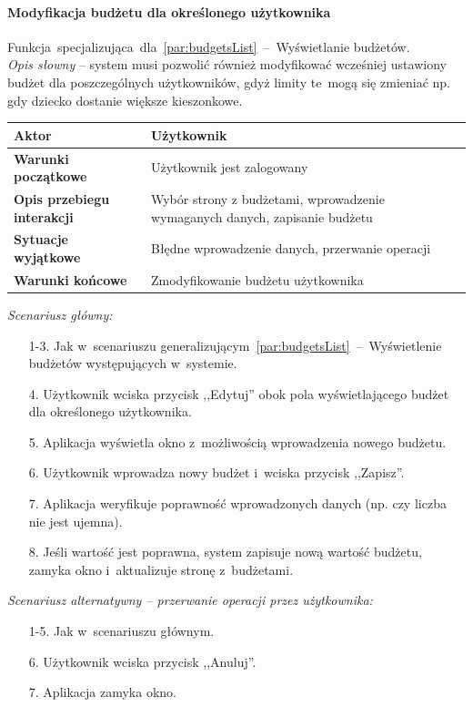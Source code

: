 \paragraph{Modyfikacja budżetu dla określonego użytkownika\newline}
\label{par:userBudgetEdit}
Funkcja~specjalizująca~dla~\ref{par:budgetsList}~--~Wyświetlanie budżetów.\\

\textit{Opis słowny} -- system musi pozwolić również modyfikować wcześniej ustawiony budżet dla poszczególnych użytkowników, gdyż limity te~mogą się zmieniać np. gdy dziecko dostanie większe kieszonkowe.

\begin{longtable}{|p{5cm}|p{7cm}|}
  \hline \textbf{Aktor} & Użytkownik \\
  \hline \textbf{Warunki początkowe} & Użytkownik jest zalogowany \\
  \hline \textbf{Opis przebiegu interakcji} & Wybór strony z budżetami, wprowadzenie wymaganych danych, zapisanie budżetu \\
  \hline \textbf{Sytuacje wyjątkowe} & Błędne wprowadzenie danych, przerwanie operacji \\
  \hline \textbf{Warunki końcowe} & Zmodyfikowanie budżetu użytkownika \\
  \hline
\end{longtable}

\noindent \textit{Scenariusz główny:}
\begin{enumerate}
  \item[1-3.] Jak w~scenariuszu generalizującym~\ref{par:budgetsList}~--~Wyświetlenie budżetów występujących w~systemie.
  \item[4.] Użytkownik wciska przycisk ,,Edytuj'' obok pola wyświetlającego budżet dla określonego użytkownika.
  \item[5.] Aplikacja wyświetla okno z~możliwością wprowadzenia nowego budżetu.
  \item[6.] Użytkownik wprowadza nowy budżet i~wciska przycisk ,,Zapisz''.
  \item[7.] Aplikacja weryfikuje poprawność wprowadzonych danych (np. czy liczba nie jest ujemna).
  \item[8.] Jeśli wartość jest poprawna, system zapisuje nową wartość budżetu, zamyka okno i~aktualizuje stronę z~budżetami.
\end{enumerate}

\noindent \textit{Scenariusz alternatywny -- przerwanie operacji przez użytkownika:}
\begin{enumerate}
  \item[1-5.] Jak w~scenariuszu głównym.
  \item[6.] Użytkownik wciska przycisk ,,Anuluj''.
  \item[7.] Aplikacja zamyka okno.
\end{enumerate}

